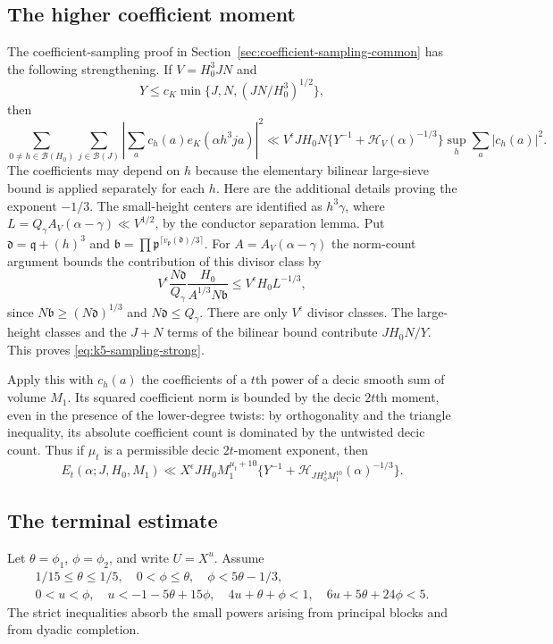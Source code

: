 \documentclass[11pt,reqno]{amsart}
\numberwithin{equation}{section}
\theoremstyle{definition}
\begin{document}
\subsection{The higher coefficient moment}
The coefficient-sampling proof in Section~\ref{sec:coefficient-sampling-common} has the
following strengthening.  If $V=H_0^3JN$ and
\[
 Y\le c_K\min\{J,N,(JN/H_0^3)^{1/2}\},
\]
then
\begin{equation}\label{eq:k5-sampling-strong}
 \sum_{0\ne h\in\mathcal B(H_0)}\sum_{j\in\mathcal B(J)}
 \left|\sum_a c_h(a)e_K(\alpha h^3ja)\right|^2
 \ll V^\epsilon JH_0N\{Y^{-1}+\mathcal H_V(\alpha)^{-1/3}\}
                      \sup_h\sum_a|c_h(a)|^2.
\end{equation}
The coefficients may depend on $h$ because the elementary bilinear
large-sieve bound is applied separately for each $h$.
Here are the additional details proving the exponent $-1/3$.
The small-height centers are identified as $h^3\gamma$, where
$L=Q_\gamma A_V(\alpha-\gamma)\ll V^{1/2}$, by the conductor separation
lemma.  Put $\mathfrak d=\mathfrak q+(h)^3$ and
$\mathfrak b=\prod\mathfrak p^{\lceil v_\mathfrak p(\mathfrak d)/3\rceil}$.
For $A=A_V(\alpha-\gamma)$ the norm-count argument bounds the contribution
of this divisor class by
\[
 V^\epsilon\frac{N\mathfrak d}{Q_\gamma}
       \frac{H_0}{A^{1/3}N\mathfrak b}
 \le V^\epsilon H_0L^{-1/3},
\]
since $N\mathfrak b\ge(N\mathfrak d)^{1/3}$ and
$N\mathfrak d\le Q_\gamma$.
There are only $V^\epsilon$ divisor classes.  The large-height classes and
the $J+N$ terms of the bilinear bound contribute $JH_0N/Y$.
This proves \eqref{eq:k5-sampling-strong}.

Apply this with $c_h(a)$ the coefficients of a $t$th power of a decic smooth
sum of volume $M_1$.  Its squared coefficient norm is bounded by the decic
$2t$th moment, even in the presence of the lower-degree twists: by
orthogonality and the triangle inequality, its absolute coefficient count
is dominated by the untwisted decic count.  Thus if $\mu_t$ is a permissible
decic $2t$-moment exponent, then
\[
 E_t(\alpha;J,H_0,M_1)
 \ll X^\epsilon JH_0M_1^{\mu_t+10}
             \{Y^{-1}+\mathcal H_{JH_0^3M_1^{10}}(\alpha)^{-1/3}\}.
\]

\subsection{The terminal estimate}
Let $\theta=\phi_1$, $\phi=\phi_2$, and write $U=X^u$.  Assume
\begin{gather}
 1/15\le\theta\le1/5,\quad 0<\phi\le\theta,\quad
 \phi<5\theta-1/3,\label{eq:k5-parameter1}\\
 0<u<\phi,\quad u<-1-5\theta+15\phi,\quad
 4u+\theta+\phi<1,\quad 6u+5\theta+24\phi<5.
 \label{eq:k5-parameter2}
\end{gather}
The strict inequalities absorb the small powers arising from principal
blocks and from dyadic completion.
\end{document}
